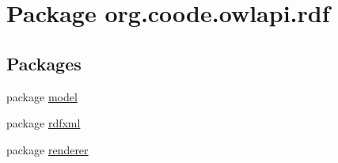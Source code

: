 \hypertarget{namespaceorg_1_1coode_1_1owlapi_1_1rdf}{\section{Package org.\-coode.\-owlapi.\-rdf}
\label{namespaceorg_1_1coode_1_1owlapi_1_1rdf}
}
\subsection*{Packages}
\begin{DoxyCompactItemize}
\item 
package \hyperlink{namespaceorg_1_1coode_1_1owlapi_1_1rdf_1_1model}{model}
\item 
package \hyperlink{namespaceorg_1_1coode_1_1owlapi_1_1rdf_1_1rdfxml}{rdfxml}
\item 
package \hyperlink{namespaceorg_1_1coode_1_1owlapi_1_1rdf_1_1renderer}{renderer}
\end{DoxyCompactItemize}

